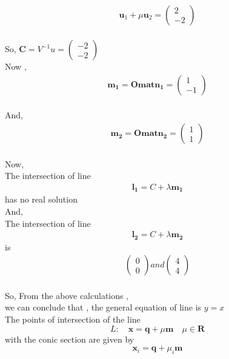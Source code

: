 \documentclass[journal,12pt,twocolumn]{IEEEtran}
\newcommand{\myvec}[1]{\ensuremath{\begin{pmatrix}#1\end{pmatrix}}}
\let\vec\mathbf
\let\vec\mathbf
\begin{document}
\\
\begin{align}
\vec{u}_1+\mu\vec{u}_2= \myvec{
2\\
-2
}
\end{align}
\\
So, $\vec{C} = V^{-1} u = \myvec{-2 \\ -2} $
\\
Now ,\\
\begin{align}
\vec{m_1}= {\vec{Omat} }  \vec{n_1}  = \myvec{1\\ -1}
\end{align}
\\
And,\\
\begin{align}
\vec{m_2}= {\vec{Omat} }  \vec{n_2} = \myvec{1\\ 1}
\end{align}
\\
Now,\\
The intersection of line \begin{align}
\vec{l_1}= C + \lambda \vec{m_1}
\end{align} has no real solution \\
And,\\
The intersection of line \begin{align}
\vec{l_2}= C + \lambda \vec{m_2}
\end{align} is \\
\begin{align}
\myvec{ 0\\0} and \myvec{4 \\4}
\end{align}
\\
So, From the above calculations ,\\
 we can conclude that , the general equation of line is $y=x$\\
 \newpage
The points of intersection of the line 
\begin{equation}
 L: \quad \vec{x} = \vec{q} + \mu \vec{m} \quad \mu \in \mathbf{R}
\label{eq:conic_tangent}
\end{equation}
with the conic section are given by
\begin{equation}
\vec{x}_i = \vec{q} + \mu_i \vec{m}
\label{eq-32-} 
\end{equation}
\end{document}
